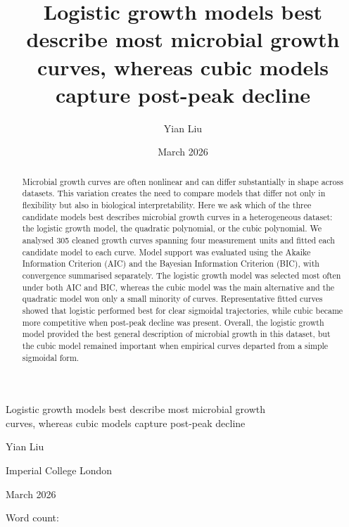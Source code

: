 \documentclass[11pt]{article}
\title{Logistic growth models best describe most microbial growth curves, whereas cubic models capture post-peak decline}
\author{Yian Liu}
\date{March 2026}
\newcommand{\wordcount}{}
\begin{document}
\begin{titlepage}
    \nolinenumbers
    \centering
    \vspace*{\fill}

    {\LARGE Logistic growth models best describe most microbial growth\\
    curves, whereas cubic models capture post-peak decline\par}

    \vspace{1.5cm}

    {\Large Yian Liu\par}

    \vspace{0.3cm}

    {\large Imperial College London\par}

    \vspace{0.8cm}

    {\large March 2026\par}

    \vspace{1.2cm}

    {\large Word count: \wordcount \par}

    \vspace*{\fill}
\end{titlepage}

\linenumbers

\begin{abstract}
Microbial growth curves are often nonlinear and can differ substantially in shape across datasets. This variation creates the need to compare models that differ not only in flexibility but also in biological interpretability. Here we ask which of the three candidate models best describes microbial growth curves in a heterogeneous dataset: the logistic growth model, the quadratic polynomial, or the cubic polynomial. We analysed 305 cleaned growth curves spanning four measurement units and fitted each candidate model to each curve. Model support was evaluated using the Akaike Information Criterion (AIC) and the Bayesian Information Criterion (BIC), with convergence summarised separately. The logistic growth model was selected most often under both AIC and BIC, whereas the cubic model was the main alternative and the quadratic model won only a small minority of curves. Representative fitted curves showed that logistic performed best for clear sigmoidal trajectories, while cubic became more competitive when post-peak decline was present. Overall, the logistic growth model provided the best general description of microbial growth in this dataset, but the cubic model remained important when empirical curves departed from a simple sigmoidal form.
\end{abstract}
\end{document}
